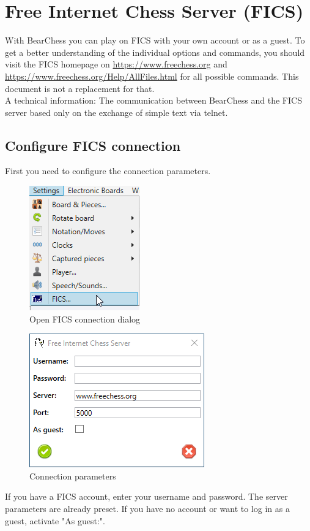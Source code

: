 \documentclass[11pt,a4paper]{article}
\begin{document}
\section{Free Internet Chess Server (FICS)}  \label{FICS}
With BearChess you can play on FICS with your own account or as a guest. To get a better understanding of the individual options and commands, you should visit the FICS homepage on \url{https://www.freechess.org} and \url{https://www.freechess.org/Help/AllFiles.html} for all possible commands. This document is not a replacement for that.\\
A technical information: The communication between BearChess and the FICS server based only on the exchange of simple text via telnet. 

\subsection{Configure FICS connection}

First you need to configure the connection parameters.
\begin{figure}[H]
	\centering
	\includegraphics[scale=1.0]{fics0.png}
	\caption{Open FICS connection dialog}
	\label{fig:fics0}
\end{figure}


\begin{figure}[H]
	\centering
	\includegraphics[scale=1.0]{fics1.png}
	\caption{Connection parameters}
	\label{fig:fics1}
\end{figure}
If you have a FICS account, enter your username and password. The server parameters are already preset. If you have no account or want to log in as a guest, activate "As guest:".
\end{document}
